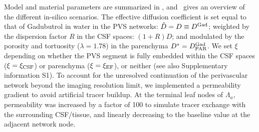 \documentclass[fleqn,10pt]{wlscirep}
\begin{document}
Model and material parameters are summarized in ,
and~ gives an overview of the different in-silico
scenarios.
%
%
The effective diffusion coefficient is set equal to that of Gadubutrol
in water in the PVS networks: $\hat{D} = D \equiv D^{\rm Gad}$; weighted by
the dispersion factor $R$ in the CSF spaces: $(1 + R) D$;
and modulated by the porosity and tortuosity ($\lambda = 1.78$) in the
parenchyma $D^{\ast} = D^{\rm Gad}_{\rm PAR}$. We set
$\xi$ depending on whether the PVS segment is fully embedded within
the CSF spaces ($\xi = \xi_{\rm CSF}$) or parenchyma ($\xi = \xi_{\rm
  EF}$), or neither (see also Supplementary information S1). To
account for the unresolved continuation of the perivascular network
beyond the imaging resolution limit, we implemented a permeability
gradient to avoid artificial tracer buildup. At the terminal leaf
nodes of $\Lambda_a$, permeability was increased by a factor of 100
to simulate tracer exchange with the surrounding CSF/tissue, and
linearly decreasing to the baseline value at the adjacent network
node.
\end{document}
